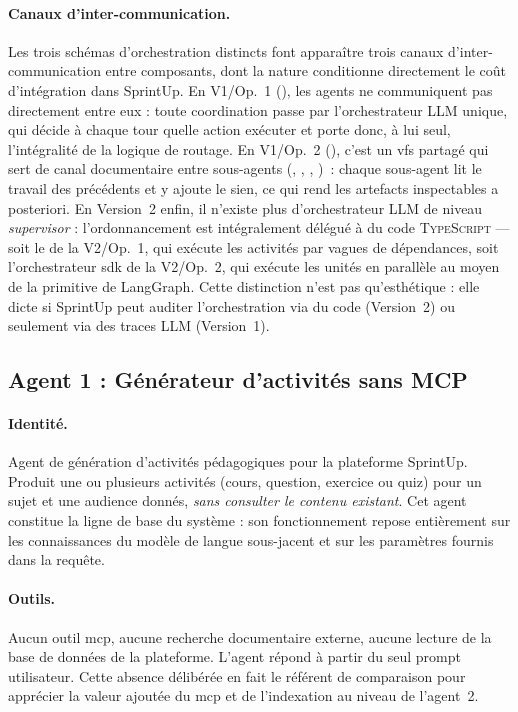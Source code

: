 \paragraph{Canaux d'inter-communication.}
Les trois schémas d'orchestration distincts font apparaître trois
canaux d'inter-communication entre composants, dont la nature
conditionne directement le coût d'intégration dans SprintUp.
En V1/Op.~1 (), les agents ne
communiquent pas directement entre eux : toute coordination passe
par l'orchestrateur \textsc{LLM} unique, qui décide à chaque tour
quelle action exécuter et porte donc, à lui seul, l'intégralité de
la logique de routage. En V1/Op.~2 (), c'est un
\gls{vfs} partagé qui sert de canal documentaire entre sous-agents
(, ,
, )~:
chaque sous-agent lit le travail des précédents et y ajoute le sien,
ce qui rend les artefacts inspectables a posteriori. En Version~2
enfin, il n'existe plus d'orchestrateur \textsc{LLM} de niveau
\emph{supervisor} : l'ordonnancement est intégralement délégué à du
code \textsc{TypeScript} — soit le 
de la V2/Op.~1, qui exécute les activités par vagues de dépendances,
soit l'orchestrateur \gls{sdk} de la V2/Op.~2, qui exécute les
unités en parallèle au moyen de la primitive  de
LangGraph. Cette distinction n'est pas qu'esthétique : elle dicte si
SprintUp peut auditer l'orchestration via du code (Version~2) ou
seulement via des traces \textsc{LLM} (Version~1).

\subsection{Agent 1 : Générateur d'activités sans MCP}
\label{sec:agent1}

\paragraph{Identité.} Agent de génération d'activités pédagogiques pour la
plateforme SprintUp. Produit une ou plusieurs activités (cours, question,
exercice ou quiz) pour un sujet et une audience donnés, \emph{sans consulter
le contenu existant}. Cet agent constitue la ligne de base du système : son
fonctionnement repose entièrement sur les connaissances du modèle de langue
sous-jacent et sur les paramètres fournis dans la requête.

\paragraph{Outils.} Aucun outil \gls{mcp}, aucune recherche documentaire
externe, aucune lecture de la base de données de la plateforme. L'agent
répond à partir du seul prompt utilisateur. Cette absence délibérée en fait
le référent de comparaison pour apprécier la valeur ajoutée du \gls{mcp} et
de l'indexation au niveau de l'agent~2.

